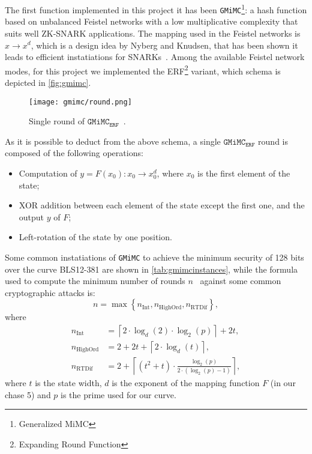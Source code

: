 \documentclass[12pt, a4paper]{report}
\begin{document}
The first function implemented in this project it has been \texttt{GMiMC}\footnote{Generalized MiMC}: a hash function based on unbalanced Feistel networks with a low multiplicative complexity that suits well ZK-SNARK applications.
The mapping used in the Feistel networks is $x \rightarrow x^d$, which is a design idea by Nyberg and Knudsen, that has been shown it leads to efficient instatiations for SNARKs~\cite{mimc}. Among the available Feistel network modes, for this project we implemented the ERF\footnote{Expanding Round Function} variant, which schema is depicted in \autoref{fig:gmimc}.

\begin{figure}[H]
  \begin{center}
    \texttt{[image: gmimc/round.png]}
  \end{center}
  \caption{Single round of $\texttt{GMiMC}_\texttt{ERF}$~\cite[Fig.~2]{gmimc}.}\label{fig:gmimc}
\end{figure}

As it is possible to deduct from the above schema, a single $\texttt{GMiMC}_\texttt{ERF}$ round is composed of the following operations:
\begin{itemize}
  \item Computation of $y = F(x_0): x_0 \rightarrow x_0^d$, where $x_0$ is the first element of the state;
  \item XOR addition between each element of the state except the first one, and the output $y$ of $F$;
  \item Left-rotation of the state by one position.
\end{itemize}

Some common instatiations of \texttt{GMiMC} to achieve the minimum security of 128 bits over the curve BLS12-381 are shown in \autoref{tab:gmimcinstances}, while the formula used to compute the minimum number of rounds $n$~\cite[Tab.~2,Tab.~3]{gmimc} against some common cryptographic attacks is:
\begin{equation}
  n = \max \left\{ n_{\text{Int}}, n_{\text{HighOrd}}, n_{\text{RTDif}} \right\},
  \label{eq:gmimcrounds}
\end{equation}
where
\begin{align}
  n_{\text{Int}} & = \left \lceil 2 \cdot \log_d(2) \cdot \log_2(p) \right\rceil + 2t ,\\[10pt]
  n_{\text{HighOrd}} & = 2 + 2t + \left \lceil 2 \cdot \log_d(t) \right\rceil ,\\[6pt]
  n_{\text{RTDif}} & = 2 + \left \lceil (t^2 + t) \cdot \frac{\log_2(p)}{2 \cdot (\log_2(p) - 1)} \right\rceil ,
\end{align}
where $t$ is the state width, $d$ is the exponent of the mapping function $F$ (in our chase 5) and $p$ is the prime used for our curve.
\end{document}
